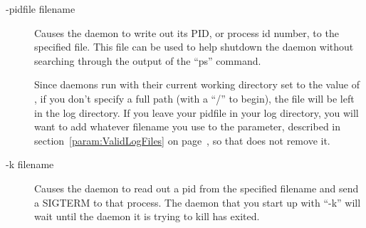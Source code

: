 \begin{description}
\item[-pidfile filename] Causes the daemon to write out its PID, or
  process id number, to the specified file.  This file can be used to
  help shutdown the daemon without searching through the output of the
  ``ps'' command.

  Since daemons run with their current working directory set to the
  value of , if you don't specify a full path (with a ``/''
  to begin), the file will be left in the log directory.  If you leave
  your pidfile in your log directory, you will want to add whatever
  filename you use to the  parameter,
  described in section~\ref{param:ValidLogFiles} on
  page~\pageref{param:ValidLogFiles}, so that  does not
  remove it.

\item[-k filename] Causes the daemon to read out a pid from the
  specified filename and send a SIGTERM to that process.  The daemon
  that you start up with ``-k'' will wait until the daemon it is
  trying to kill has exited.  


\end{description}

